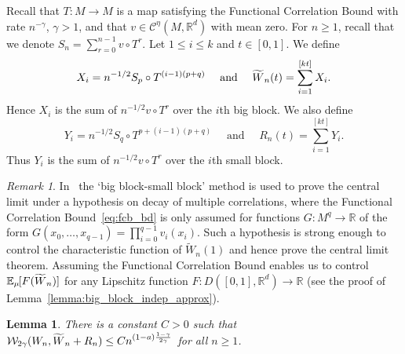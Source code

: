 \documentclass[11pt,a4paper,reqno,oneside]{amsart}
\newcommand{\R}{\ensuremath{\mathbb{R}}}%
\newcommand{\holsp}[1][\eta]{\mathcal{C}^{#1}}
\newcommand{\Ex}[2][]{\mathbb{E}_{#1\!\!}\left[#2\right]}
\newcommand{\wass}{\mathcal{W}}
\newcommand{\stilde}[1]{\vphantom{#1}\smash[t]{\widetilde{#1}}}
\newtheorem{lemma}[theorem]{Lemma}
\theoremstyle{definition}
\theoremstyle{remark}
\newtheorem{remark}[theorem]{Remark}
\numberwithin{equation}{section}
\begin{document}
	Recall that $T:M\to M$ is a map satisfying the Functional Correlation Bound with rate $n^{-\gamma}$, $\gamma>1$, and that $v\in \holsp(M,\R^d)$ with mean zero.
	For $ n\ge 1 $, recall that we denote $ S_n=\sum_{r=0}^{n-1}v\circ T^r $. Let $ 1\le i\le k $ and $t\in [0,1]$. We define 
	\[ X_i = n^{-1/2}S_p\circ T^{(i-1)(p+q)}\quad \text{ and }\quad\stilde W_n(t)=\sum_{i=1}^{[kt]}X_i. \]
	Hence $ X_i $ is the sum of $ n^{-1/2}v\circ T^r $ over the $ i $th big block. We also define 
	\[ Y_i = n^{-1/2}S_q\circ T^{p+(i-1)(p+q)}\quad \text{ and }\quad R_n(t)=\sum_{i=1}^{[kt]}Y_i. \]
	Thus $ Y_i $ is the sum of $ n^{-1/2}v\circ T^r $ over the $ i $th small block.
    \begin{remark}\label{remark:chernov_clt}
           In~\cite[Section 7.8]{chernov_markarian} the `big block-small block' method is used to prove the central limit under a hypothesis on decay of multiple correlations, where the Functional Correlation Bound~\eqref{eq:fcb_bd} is
only assumed for functions $G : M^q \to \R$ of the form $G(x_0, \dots,x_{q-1}) = \prod_{i=0}^{q-1}v_i(x_i)$. Such a hypothesis is strong enough to control the characteristic function of $\widetilde{W}_n(1)$ and hence prove the central limit theorem. Assuming the Functional Correlation Bound enables us to control $\Ex[\mu]{F(\stilde{W}_n)}$ for any Lipschitz function $F:D([0,1],\R^d)\to \R$ (see the proof of Lemma~\ref{lemma:big_block_indep_approx}).     
    \end{remark}
\begin{lemma}\label{lemma:blocking_step_error}There is a constant $ C>0 $ such that 
		$ \wass_{2\gamma}(W_n, \stilde W_n+R_n)\le Cn^{(1-a)\frac{1-\gamma}{2\gamma}} $ for all $ n\ge 1 $.
	\end{lemma}
\end{document}
